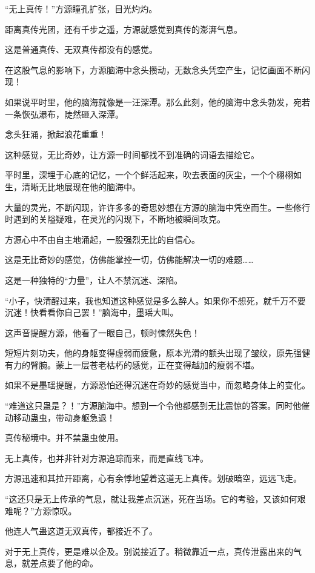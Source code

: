 
\begin{this_body}

“无上真传！”方源瞳孔扩张，目光灼灼。

距离真传光团，还有千步之遥，方源就感觉到真传的澎湃气息。

这是普通真传、无双真传都没有的感觉。

在这股气息的影响下，方源脑海中念头攒动，无数念头凭空产生，记忆画面不断闪现！

如果说平时里，他的脑海就像是一汪深潭。那么此刻，他的脑海中念头勃发，宛若一条恢弘瀑布，陡然砸入深潭。

念头狂涌，掀起浪花重重！

这种感觉，无比奇妙，让方源一时间都找不到准确的词语去描绘它。

平时里，深埋于心底的记忆，一个个鲜活起来，吹去表面的灰尘，一个个栩栩如生，清晰无比地展现在他的脑海中。

大量的灵光，不断闪现，许许多多的奇思妙想在方源的脑海中凭空而生。一些修行时遇到的关隘疑难，在灵光的闪现下，不断地被瞬间攻克。

方源心中不由自主地涌起，一股强烈无比的自信心。

这是无比奇妙的感觉，仿佛能掌控一切，仿佛能解决一切的难题……

这是一种独特的“力量”，让人不禁沉迷、深陷。

“小子，快清醒过来，我也知道这种感觉是多么醉人。如果你不想死，就千万不要沉迷！快看看你自己罢！”脑海中，墨瑶大叫。

这声音提醒方源，他看了一眼自己，顿时悚然失色！

短短片刻功夫，他的身躯变得虚弱而疲惫，原本光滑的额头出现了皱纹，原先强健有力的臂腕。蒙上一层苍老枯朽的感觉，正在变得越加的瘦弱不堪。

如果不是墨瑶提醒，方源恐怕还得沉迷在奇妙的感觉当中，而忽略身体上的变化。

“难道这只蛊是？！”方源脑海中。想到一个令他都感到无比震惊的答案。同时他催动移动蛊虫，带动身躯急退！

真传秘境中。并不禁蛊虫使用。

无上真传，也并非针对方源追踪而来，而是直线飞冲。

方源迅速和其拉开距离，心有余悸地望着这道无上真传。划破暗空，远远飞走。

“这还只是无上传承的气息，就让我差点沉迷，死在当场。它的考验，又该如何艰难呢？”方源惊叹。

他连人气蛊这道无双真传，都接近不了。

对于无上真传，更是难以企及。别说接近了。稍微靠近一点，真传泄露出来的气息，就差点要了他的命。


\end{this_body}
